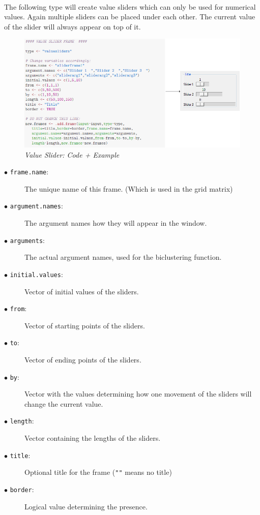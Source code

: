\documentclass[a4paper]{article}\usepackage[]{graphicx}\usepackage[]{color}
\begin{document}
\\
The following type will create value sliders which can only be used for
numerical values. Again multiple sliders can be placed under each other. The
current value of the slider will always appear on top of it.

\begin{figure}[H]
\centering
\includegraphics[scale=0.5]{figures/slider.png}
\caption{{\it Value Slider: Code + Example}
\label{radiobuttons}}
\end{figure}

\begin{description}
  \item[$\bullet$ \texttt{frame.name}:] The unique name of this frame. (Which is used in the grid matrix)
  \item[$\bullet$ \texttt{argument.names}:] The argument names how they will
  appear in the window.  
  \item[$\bullet$ \texttt{arguments}:] The actual argument names, used for the
  biclustering function.  
  \item[$\bullet$ \texttt{initial.values}:] Vector of initial values of the
  sliders.
  \item[$\bullet$ \texttt{from}:] Vector of starting points of the sliders.
  \item[$\bullet$ \texttt{to}:] Vector of ending points of the sliders.
  \item[$\bullet$ \texttt{by}:] Vector with the values determining how one
  movement of the sliders will change the current value.
  \item[$\bullet$ \texttt{length}:] Vector containing the lengths of the
  sliders.
  \item[$\bullet$ \texttt{title}:] Optional title for the frame (\verb|""| means no title)
  \item[$\bullet$ \texttt{border}:] Logical value determining the presence.   
  
\end{description}
\end{document}
